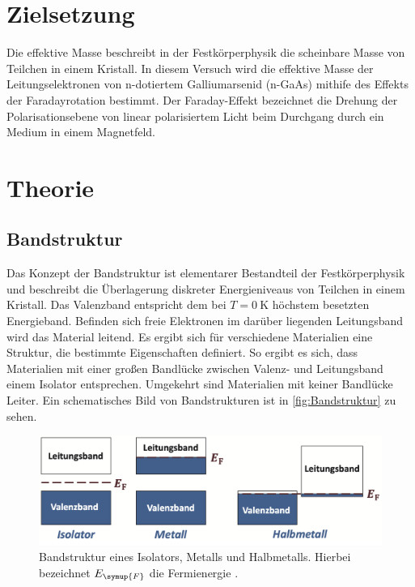 \section{Zielsetzung}
\label{sec:Zielsetzung}
Die effektive Masse beschreibt in der Festkörperphysik die scheinbare Masse von Teilchen in einem Kristall. In diesem Versuch wird die effektive Masse der Leitungselektronen von
n-dotiertem Galliumarsenid (n-GaAs) mithife des Effekts der Faradayrotation bestimmt. Der Faraday-Effekt bezeichnet die Drehung der Polarisationsebene von linear polarisiertem Licht
beim Durchgang durch ein Medium in einem Magnetfeld.

\section{Theorie}
\label{sec:Theorie}
\subsection{Bandstruktur}
\label{subsec:Bandstruktur}
Das Konzept der Bandstruktur ist elementarer Bestandteil der Festkörperphysik und beschreibt die Überlagerung diskreter Energieniveaus von Teilchen in einem Kristall. Das Valenzband
entspricht dem bei $T=\qty{0}{\kelvin}$ höchstem besetzten Energieband. Befinden sich freie Elektronen im darüber liegenden Leitungsband wird das Material leitend.
Es ergibt sich für verschiedene Materialien eine Struktur, die bestimmte Eigenschaften definiert. So ergibt es sich, dass Materialien mit einer großen Bandlücke zwischen 
Valenz- und Leitungsband einem Isolator entsprechen. Umgekehrt sind Materialien mit keiner Bandlücke Leiter. Ein schematisches Bild von Bandstrukturen ist in \autoref{fig:Bandstruktur}
zu sehen.

\begin{figure}
    \centering
    \includegraphics[width=\textwidth]{content/pics/Bandstruktur.png}
    \caption{Bandstruktur eines Isolators, Metalls und Halbmetalls. Hierbei bezeichnet $E_{\symup{F}}$ die Fermienergie \cite{GrossMarx2018}.}
    \label{fig:Bandstruktur}
\end{figure}

